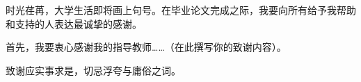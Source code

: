 \thankstitle

时光荏苒，大学生活即将画上句号。在毕业论文完成之际，我要向所有给予我帮助和支持的人表达最诚挚的感谢。

首先，我要衷心感谢我的指导教师……（在此撰写你的致谢内容）。

致谢应实事求是，切忌浮夸与庸俗之词。
